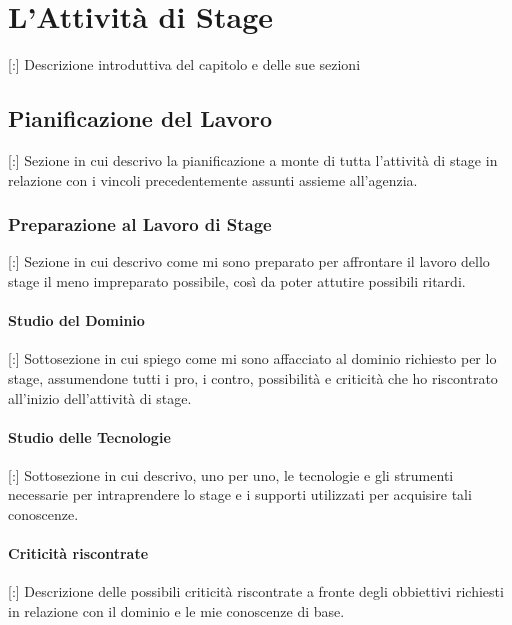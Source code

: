 \chapter{L'Attività di Stage}
\label{3.0}
\thispagestyle{fancy} 

[:] Descrizione introduttiva del capitolo e delle sue sezioni

\section{Pianificazione del Lavoro}

[:] Sezione in cui descrivo la pianificazione a monte di tutta l'attività di stage in relazione con i vincoli precedentemente assunti assieme all'agenzia.



\subsection{Preparazione al Lavoro di Stage}

[:] Sezione in cui descrivo come mi sono preparato per affrontare il lavoro dello stage il meno impreparato possibile, così da poter attutire possibili ritardi.

\subsubsection{Studio del Dominio}

[:] Sottosezione in cui spiego come mi sono affacciato al dominio richiesto per lo stage, assumendone tutti i pro, i contro, possibilità e criticità che ho riscontrato all'inizio dell'attività di stage.

\subsubsection{Studio delle Tecnologie}

[:] Sottosezione in cui descrivo, uno per uno, le tecnologie e gli strumenti necessarie per intraprendere lo stage e i supporti utilizzati per acquisire tali conoscenze.


\subsubsection{Criticità riscontrate}

[:] Descrizione delle possibili criticità riscontrate a fronte degli obbiettivi richiesti in relazione con il dominio e le mie conoscenze di base.



